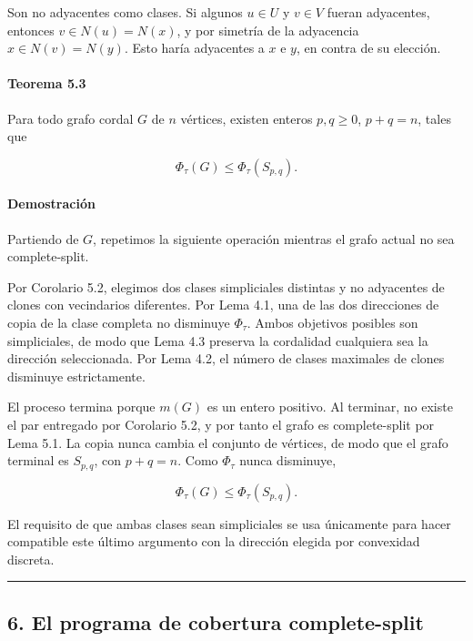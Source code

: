 \documentclass[
  spanish,
  11pt,
  a4paper,
]{article}
\begin{document}
Son no adyacentes como clases. Si algunos \(u\in U\) y \(v\in V\) fueran adyacentes, entonces \(v\in N(u)=N(x)\), y por simetría de la adyacencia \(x\in N(v)=N(y)\). Esto haría adyacentes a \(x\) e \(y\), en contra de su elección.

\paragraph{Teorema 5.3}\label{teorema-5.3}

Para todo grafo cordal \(G\) de \(n\) vértices, existen enteros \(p,q\ge0\), \(p+q=n\), tales que

\[
\boxed{
\Phi_\tau(G)\le\Phi_\tau(S_{p,q}).
}
\]

\paragraph{Demostración}\label{demostraciuxf3n-7}

Partiendo de \(G\), repetimos la siguiente operación mientras el grafo actual no sea complete-split.

Por Corolario 5.2, elegimos dos clases simpliciales distintas y no adyacentes de clones con vecindarios diferentes. Por Lema 4.1, una de las dos direcciones de copia de la clase completa no disminuye \(\Phi_\tau\). Ambos objetivos posibles son simpliciales, de modo que Lema 4.3 preserva la cordalidad cualquiera sea la dirección seleccionada. Por Lema 4.2, el número de clases maximales de clones disminuye estrictamente.

El proceso termina porque \(m(G)\) es un entero positivo. Al terminar, no existe el par entregado por Corolario 5.2, y por tanto el grafo es complete-split por Lema 5.1. La copia nunca cambia el conjunto de vértices, de modo que el grafo terminal es \(S_{p,q}\), con \(p+q=n\). Como \(\Phi_\tau\) nunca disminuye,

\[
\Phi_\tau(G)\le\Phi_\tau(S_{p,q}).
\]

El requisito de que ambas clases sean simpliciales se usa únicamente para hacer compatible este último argumento con la dirección elegida por convexidad discreta.

\begin{center}\rule{0.5\linewidth}{0.5pt}\end{center}

\subsection{6. El programa de cobertura complete-split}\label{el-programa-de-cobertura-complete-split}
\end{document}
